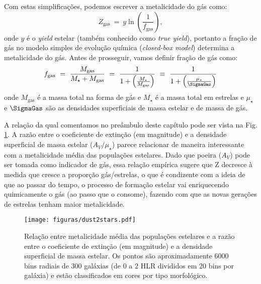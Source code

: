 Com estas simplificações, podemos escrever a metalicidade do gás como:
\begin{equation}
	Z_{\mathrm{gas}}\ =\ y \ln \left(\frac{1}{f_{\mathrm{gas}}}\right),
	\label{eq:Zgas_closedbox}
\end{equation}
\noindent onde $y$ é o {\em yield} estelar (também conhecido como {\em true yield}), portanto a
fração de gás no modelo simples de evolução química ({\em closed-box model}) determina a
metalicidade do gás. Antes de prosseguir, vamos definir fração de gás como:
\begin{equation}
	f_{\mathrm{gas}}\ =\ \frac{M_{\mathrm{gas}}}{M_\star + M_{\mathrm{gas}}}\ =\ \frac{1}{1 +
	\left(\frac{M_\star}{M_{\mathrm{gas}}}\right)}\ \equiv\ \frac{1}{1 +
	\left(\frac{\mu_\star}{\SigmaGas}\right)}
	\label{eq:fgas}
\end{equation}
\noindent onde $M_{\mathrm{gas}}$ é a massa total na forma de gás e $M_\star$ é a massa total em
estrelas e $\mu_\star$ e $\SigmaGas$ são as densidades superficiais de massa estelar e de massa de
gás.

A relação da qual comentamos no preâmbulo deste capítulo pode ser vista na Fig.
\ref{fig:dust2stars}. A razão entre o coeficiente de extinção (em magnitude) e a densidade
superficial de massa estelar ($A_V / \mu_\star$) parece relacionar de maneira interessante com a
metalicidade média das populações estelares. Dado que poeira ($A_V$) pode ser tomada como indicador
de gás, essa relação empírica sugere que Z decresce à medida que cresce a proporção gás/estrelas, o
que é condizente com a ideia de que ao passar do tempo, o processo de formação estelar vai
enriquecendo quimicamente o gás (ao passo que o consome), fazendo com que as novas gerações de
estrelas tenham maior metalicidade.
 
\begin{figure}
	\centering
	\texttt{[image: figuras/dust2stars.pdf]}
	\caption[$A_V / \mu_\star$ vs. ]
	{Relação entre metalicidade média das populações estelares e a razão entre o coeficiente de
extinção (em magnitude) e a densidade superficial de massa estelar. Os pontos são aproximadamente
6000 bins radiais de 300 galáxias (de 0 a 2 HLR divididos em 20 bins por galáxia) e estão
classificados em cores por tipo morfológico.}
	\label{fig:dust2stars}
\end{figure} 

